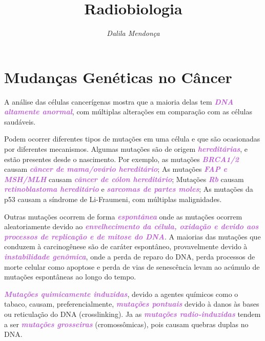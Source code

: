 \documentclass[11pt,a4paper]{article}
\title{\LobsterTwo\Huge{Radiobiologia}}
\author{\LobsterTwo{Carcinogênese\nocite{*}}}
\date{\LobsterTwo\textit{Dalila Mendonça}}
\newcounter{exemplo}
\begin{document}
	\maketitle


\section{Mudanças Genéticas no Câncer}

    A análise das células cancerígenas mostra que a maioria delas tem \textcolor{MediumOrchid}{\textbf{\textit{DNA altamente anormal}}}, com múltiplas alterações em comparação com as células saudáveis. 
    
    Podem ocorrer diferentes tipos de mutações em uma célula e que são ocasionadas por diferentes mecanismos. Algumas mutações são de origem \textcolor{MediumOrchid}{\textbf{\textit{hereditárias}}}, e estão presentes desde o nascimento. Por exemplo, as mutações \textcolor{MediumOrchid}{\textbf{\textit{BRCA1/2}}} causam \textcolor{MediumOrchid}{\textbf{\textit{câncer de mama/ovário hereditário}}}; As mutações \textcolor{MediumOrchid}{\textbf{\textit{FAP e MSH/MLH}}} causam \textcolor{MediumOrchid}{\textbf{\textit{câncer de cólon hereditário}}}; Mutações \textcolor{MediumOrchid}{\textbf{\textit{Rb}}} causam \textcolor{MediumOrchid}{\textbf{\textit{retinoblastoma hereditário}}} e \textcolor{MediumOrchid}{\textbf{\textit{sarcomas de partes moles}}}; As mutações da p53 causam a síndrome de Li-Fraumeni, com múltiplas malignidades.
    
    Outras mutações ocorrem de forma \textcolor{MediumOrchid}{\textbf{\textit{espontânea}}} onde as mutações ocorrem aleatoriamente devido ao \textcolor{MediumOrchid}{\textbf{\textit{envelhecimento da célula, oxidação e devido aos processos de replicação e de mitose do DNA}}}. A maiorias das mutações que conduzem à carcinogênese são de caráter espontâneo, provavelmente devido à \textcolor{MediumOrchid}{\textbf{\textit{instabilidade genômica}}}, onde a perda de reparo do DNA, perda processos de morte celular como apoptose e perda de vias de senescência levam ao acúmulo de mutações espontâneas ao longo do tempo.

    \textcolor{MediumOrchid}{\textbf{\textit{Mutações quimicamente induzidas}}}, devido a agentes químicos como o tabaco, causam, preferencialmente, \textcolor{MediumOrchid}{\textbf{\textit{mutações pontuais}}} devido à danos às bases ou reticulação do DNA (crosslinking). Ja as \textcolor{MediumOrchid}{\textbf{\textit{mutações radio-induzidas}}} tendem a ser \textcolor{MediumOrchid}{\textbf{\textit{mutações grosseiras}}} (cromossômicas), pois causam quebras duplas no DNA.
\end{document}
